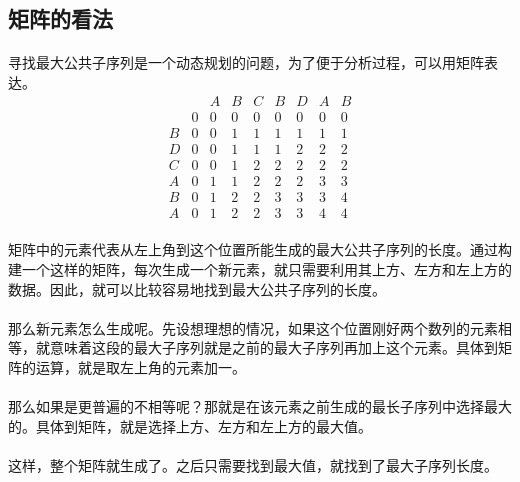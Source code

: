 \documentclass[UTF-8, 12pt]{ctexart}
\begin{document}
    \subsection{矩阵的看法}
    \paragraph{}
    寻找最大公共子序列是一个动态规划的问题，为了便于分析过程，可以用矩阵表达。
    \begin{equation}
    \begin{array}{ccccccccc}
       &   & A & B & C & B & D & A & B\\
       & 0 & 0 & 0 & 0 & 0 & 0 & 0 & 0\\
     B & 0 & 0 & 1 & 1 & 1 & 1 & 1 & 1\\
     D & 0 & 0 & 1 & 1 & 1 & 2 & 2 & 2\\
     C & 0 & 0 & 1 & 2 & 2 & 2 & 2 & 2\\
     A & 0 & 1 & 1 & 2 & 2 & 2 & 3 & 3\\
     B & 0 & 1 & 2 & 2 & 3 & 3 & 3 & 4\\
     A & 0 & 1 & 2 & 2 & 3 & 3 & 4 & 4
    \end{array}
    \end{equation}
    \paragraph{}
    矩阵中的元素代表从左上角到这个位置所能生成的最大公共子序列的长度。通过构建一个这样的矩阵，每次生成一个新元素，就只需要利用其上方、左方和左上方的数据。因此，就可以比较容易地找到最大公共子序列的长度。
    \paragraph{}
    那么新元素怎么生成呢。先设想理想的情况，如果这个位置刚好两个数列的元素相等，就意味着这段的最大子序列就是之前的最大子序列再加上这个元素。具体到矩阵的运算，就是取左上角的元素加一。
    \paragraph{}
    那么如果是更普遍的不相等呢？那就是在该元素之前生成的最长子序列中选择最大的。具体到矩阵，就是选择上方、左方和左上方的最大值。
    \paragraph{}
    这样，整个矩阵就生成了。之后只需要找到最大值，就找到了最大子序列长度。
    
\end{document}
